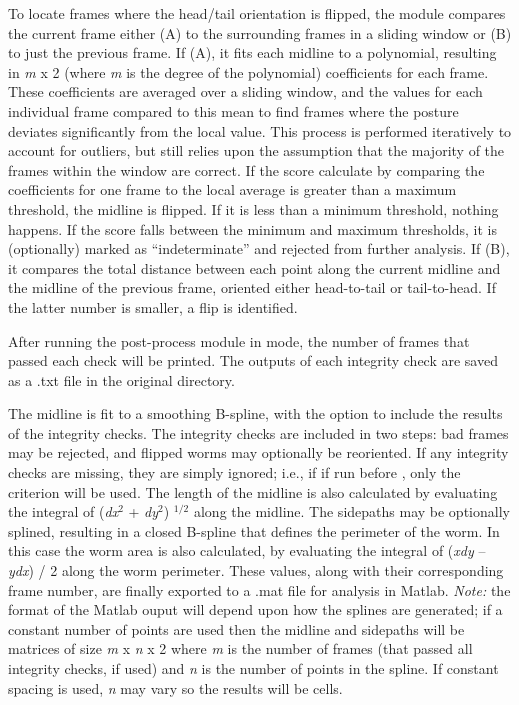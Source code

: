 \documentclass[letterpaper,10pt,openany,oneside]{sphinxmanual}
\begin{document}
To locate frames where the head/tail orientation is flipped, the  module compares the current frame either (A) to the surrounding frames in a sliding window or (B) to just the previous frame. If (A), it fits each midline to a polynomial, resulting in \emph{m} x 2 (where \emph{m} is the degree of the polynomial) coefficients for each frame. These coefficients are averaged over a sliding window, and the values for each individual frame compared to this mean to find frames where the posture deviates significantly from the local value. This process is performed iteratively to account for outliers, but still relies upon the assumption that the majority of the frames within the window are correct. If the score calculate by comparing the coefficients for one frame to the local average is greater than a maximum threshold, the midline is flipped. If it is less than a minimum threshold, nothing happens. If the score falls between the minimum and maximum thresholds, it is (optionally) marked as ``indeterminate'' and rejected from further analysis. If (B), it compares the total distance between each point along the current midline and the midline of the previous frame, oriented either head-to-tail or tail-to-head. If the latter number is smaller, a flip is identified.

After running the post-process module in  mode, the number of frames that passed each check will be printed. The outputs of each integrity check are saved as a .txt file in the original  directory.


The midline is fit to a smoothing B-spline, with the option to include the results of the integrity checks. The integrity checks are included in two steps: bad frames may be rejected, and flipped worms may optionally be reoriented. If any integrity checks are missing, they are simply ignored; i.e., if  if run before , only the  criterion will be used. The length of the midline is also calculated by evaluating the integral of (\emph{dx}$^{\text{2}}$ + \emph{dy}$^{\text{2}}$) $^{\text{1/2}}$ along the midline. The sidepaths may be optionally splined, resulting in a closed B-spline that defines the perimeter of the worm. In this case the worm area is also calculated, by evaluating the integral of (\emph{xdy} -- \emph{ydx}) / 2 along the worm perimeter. These values, along with their corresponding frame number, are finally exported to a .mat file for analysis in Matlab. \emph{Note:} the format of the Matlab ouput will depend upon how the splines are generated; if a constant number of points are used then the midline and sidepaths will be matrices of size \emph{m} x \emph{n} x 2 where \emph{m} is the number of frames (that passed all integrity checks, if used) and \emph{n} is the number of points in the spline. If  constant spacing is used, \emph{n} may vary so the results will be cells.
\end{document}
